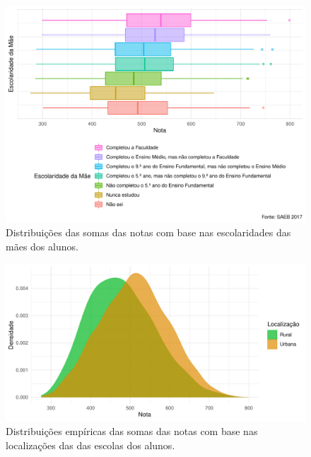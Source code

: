 \newpage
\begin{figure}[h]
    \caption{Distribuições das somas das notas com base nas escolaridades 
    das mães dos alunos.}
    \begin{center}
        \includegraphics[width=16cm]{img/esc_mae_notas.pdf}
    \end{center}
\end{figure}

\newpage

\begin{figure}[htb]
    \caption{Distribuições empíricas das somas das notas com base nas localizações das
    das escolas dos alunos.}
    \begin{center}
        \includegraphics[width=16cm]{img/loc_notas.pdf}
    \end{center}
\end{figure}

